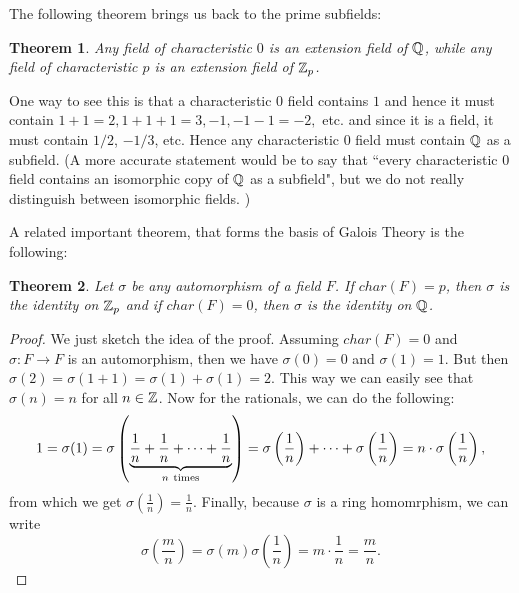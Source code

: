 \documentclass[12pt]{article}
\theoremstyle{plain}
\newtheorem{theorem}{Theorem}
\theoremstyle{definition}
\theoremstyle{remark}
\begin{document}
The following theorem brings us back to the prime subfields:
\begin{theorem}
Any field of characteristic $0$ is an extension field of $\mathbb{Q}$, while any field of characteristic $p$ is an extension field of $\mathbb{Z}_p$.
\end{theorem}
One way to see this is that a characteristic $0$ field contains $1$ and hence it must contain $1+1=2, 1+1+1=3, -1, -1-1=-2,$ etc. and since it is a field, it must contain $1/2$, $-1/3$, etc. Hence any characteristic $0$ field must contain $\mathbb{Q}$ as a subfield. (A more accurate statement would be to say that ``every characteristic $0$ field contains an isomorphic copy of $\mathbb{Q}$ as a subfield", but we do not really distinguish between isomorphic fields. )

A related important theorem, that forms the basis of Galois Theory is the following:
\begin{theorem}
Let $\sigma$ be any automorphism of a field $F$. If $char(F)=p$, then $\sigma$ is the identity on $\mathbb{Z}_p$ and if $char(F)=0$, then $\sigma$ is the identity on $\mathbb{Q}$.
\end{theorem}
\begin{proof}
We just sketch the idea of the proof. Assuming $char(F)=0$ and $\sigma:F\rightarrow F$ is an automorphism, then we have
$\sigma(0)=0$ and $\sigma(1)=1$. But then $\sigma(2)=\sigma(1+1)=\sigma(1)+\sigma(1)=2.$ This way we can easily see that $\sigma(n)=n$ for all $n\in \mathbb{Z}$. Now for the rationals, we can do the following:
$$1=\sigma(1) = \sigma\left (\underbrace{\frac{1}{n} +\frac{1}{n} +\cdots + \frac{1}{n}}_{n\rm\ times}\right ) = \sigma\left (\frac{1}{n}\right )+\cdots+\sigma \left (\frac{1}{n}\right ) = n\cdot\sigma\left (\frac{1}{n}\right ), $$
from which we get $\sigma\left (\frac{1}{n}\right ) = \frac{1}{n}$. Finally, because $\sigma$ is a ring homomrphism, we can write
$$\sigma\left (\frac{m}{n}\right ) = \sigma(m)\sigma\left (\frac{1}{n}\right ) = m\cdot \frac{1}{n}=\frac{m}{n}. $$
\end{proof}
\end{document}
